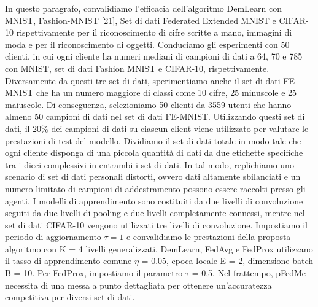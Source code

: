 In questo paragrafo, convalidiamo l'efficacia dell'algoritmo DemLearn con MNIST, Fashion-MNIST [21], Set di dati Federated Extended MNIST e CIFAR-10 rispettivamente per il riconoscimento di cifre scritte a mano, immagini di moda e per il riconoscimento di oggetti. Conduciamo gli esperimenti con 50 clienti, in cui ogni cliente ha numeri mediani di campioni di dati a 64, 70 e 785 con MNIST, set di dati Fashion MNIST e CIFAR-10, rispettivamente. Diversamente da questi tre set di dati, sperimentiamo anche il set di dati FE-MNIST che ha un numero maggiore di classi come 10 cifre, 25 minuscole e 25 maiuscole. Di conseguenza, selezioniamo 50 clienti da 3559 utenti che hanno almeno 50 campioni di dati nel set di dati FE-MNIST. Utilizzando questi set di dati, il 20\% dei campioni di dati su ciascun client viene utilizzato per valutare le prestazioni di test del modello. Dividiamo il set di dati totale in modo tale che ogni cliente disponga di una piccola quantità di dati da due etichette specifiche tra i dieci complessivi in entrambi i set di dati. In tal modo, replichiamo uno scenario di set di dati personali distorti, ovvero dati altamente sbilanciati e un numero limitato di campioni di addestramento possono essere raccolti presso gli agenti. I modelli di apprendimento sono costituiti da due livelli di convoluzione seguiti da due livelli di pooling e due livelli completamente connessi, mentre nel set di dati CIFAR-10 vengono utilizzati tre livelli di convoluzione. Impostiamo il periodo di aggiornamento $\tau=1$ e convalidiamo le prestazioni della proposta algoritmo con K = 4 livelli generalizzati. DemLearn, FedAvg e FedProx utilizzano il tasso di apprendimento comune $\eta$ = 0.05, epoca locale E = 2, dimensione batch B = 10.
Per FedProx, impostiamo il parametro $\tau$ = 0,5. Nel frattempo, pFedMe necessita di una messa a punto dettagliata per ottenere un'accuratezza competitiva per diversi set di dati.\\
